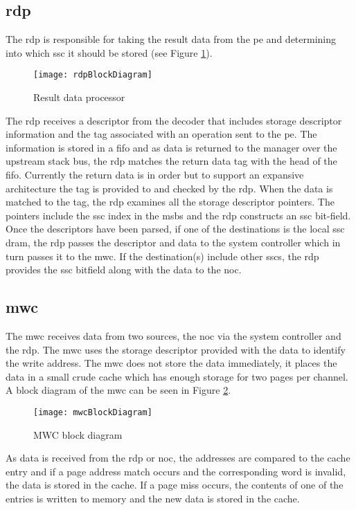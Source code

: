 \subsection{\Acf{rdp}}
\label{sec:RDP}
The \ac{rdp} is responsible for taking the result data from the \ac{pe} and determining into which \ac{ssc} it should be stored (see Figure \ref{fig:RDP block diagram}).

\begin{figure}[h]
\centering
\captionsetup{justification=centering}
\captionsetup{width=.9\linewidth}
\centerline{
\mbox{\texttt{[image: rdpBlockDiagram]}}
}
\center\caption{Result data processor}
\label{fig:RDP block diagram}
\end{figure}

The \ac{rdp} receives a descriptor from the decoder that includes storage descriptor information and the tag associated with an operation sent to the \ac{pe}.
The information is stored in a \ac{fifo} and as data is returned to the manager over the upstream stack bus, the \ac{rdp} matches the return data tag with the head of the \ac{fifo}.
Currently the return data is in order but to support an expansive architecture the tag is provided to and checked by the \ac{rdp}.
When the data is matched to the tag, the \ac{rdp} examines all the storage descriptor pointers. The pointers include the \ac{ssc} index in the \acp{msb} and the \ac{rdp} constructs an \ac{ssc} bit-field.
Once the descriptors have been parsed, if one of the destinations is the local \ac{ssc} \ac{dram}, the \ac{rdp} passes the descriptor and data to the system controller which in turn passes it to the \ac{mwc}.
If the destination(s) include other \acp{ssc}, the \ac{rdp} provides the \ac{ssc} bitfield along with the data to the \ac{noc}.


\subsection{\Acf{mwc}}
\label{sec:MWC}

The \acf{mwc} receives data from two sources, the \ac{noc} via the system controller and the \ac{rdp}.
The \ac{mwc} uses the storage descriptor provided with the data to identify the write address.
The \ac{mwc} does not store the data immediately, it places the data in a small crude cache which has enough storage for two pages per channel.
A block diagram of the \ac{mwc} can be seen in Figure \ref{fig:MWC block diagram}.
\begin{figure}[h]
\centering
\captionsetup{justification=centering}
\captionsetup{width=.9\linewidth}
\centerline{
\mbox{\texttt{[image: mwcBlockDiagram]}}
}
\center\caption{MWC block diagram}
\label{fig:MWC block diagram}
\end{figure}
As data is received from the \ac{rdp} or \ac{noc}, the addresses are compared to the cache entry and if a page address match occurs and the corresponding word is invalid, the data is stored in the cache.
If a page miss occurs, the contents of one of the entries is written to memory and the new data is stored in the cache.

